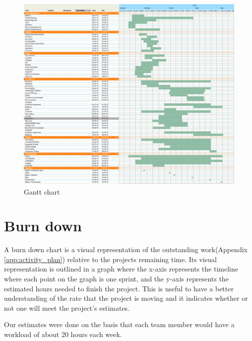 \begin{figure}[h!]
	\centering
	\includegraphics[width=\textwidth]{fig/gantt}
	\caption{Gantt chart}
	\label{Fig:gantt}
\end{figure}

\section{Burn down}


A burn down chart is a visual representation of the outstanding work(Appendix \ref{app:activity_plan}) relative to the projects remaining time. Its visual representation is outlined in a graph where the x-axis represents the timeline where each point on the graph is one sprint, and the y-axis represents the estimated hours needed to finish the project. This is useful to have a better understanding of the rate that the project is moving and it indicates whether or not one will meet the project's estimates.\newline

Our estimates were done on the basis that each team member would have a workload of about 20 hours each week. 


